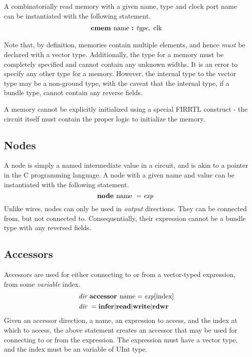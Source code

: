 \documentclass[12pt]{article}
\begin{document}
A combinatorially read memory with a given name, type and clock port name can be instantiated with the following statement.
\[
\begin{aligned}
\text{\bf cmem\ } \text{name } \text{\bf :\ } \text{\em type},\text{ clk} \\
\end{aligned}
\]

Note that, by definition, memories contain multiple elements, and hence {\em must} be declared with a vector type.
Additionally, the type for a memory must be completely specified and cannot contain any unknown widths.
It is an error to specify any other type for a memory.
However, the internal type to the vector type may be a non-ground type, with the caveat that the internal type, if a bundle type, cannot contain any reverse fields.

A memory cannot be explicitly initialized using a special FIRRTL construct - the circuit itself must contain the proper logic to initialize the memory.

\subsection{Nodes}
A node is simply a named intermediate value in a circuit, and is akin to a pointer in the C programming language.
A node with a given name and value can be instantiated with the following statement.
\[
\text{\bf node\ } \text{name } = \text{\em exp\ } \\
\]
Unlike wires, nodes can only be used in {\em output} directions.
They can be connected from, but not connected to.
Consequentially, their expression cannot be a bundle type with any reversed fields.

\subsection{Accessors}
Accessors are used for either connecting to or from a vector-typed expression, from some {\em variable} index.
\[
\begin{aligned}
&\text{\em dir\ } \text{\bf accessor\ } \text{name} = \text{\em exp}[\text{index}] \\
&\text{\em dir\ }        =     \text{\bf infer} \vert \text{\bf read} \vert \text{\bf write} \vert \text{\bf rdwr\ } \\
\end{aligned}
\]
Given an accessor direction, a name, an expression to access, and the index at which to access, the above statement creates an accessor that may be used for connecting to or from the expression.
The expression must have a vector type, and the index must be an variable of UInt type.
\end{document}
